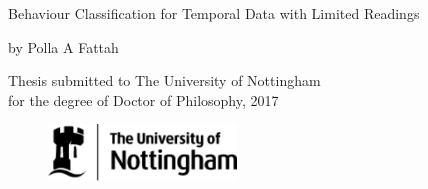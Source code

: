 \begin{titlepage}

\Huge 
\begin{center}

\vspace*{2cm}
Behaviour Classification for Temporal Data with Limited Readings

\vspace{1.5cm}

\LARGE

by Polla A Fattah

\vspace{1.5cm}


Thesis submitted to The University of Nottingham \\
for the degree of Doctor of Philosophy, 2017

\vspace{2.5cm}

\begin{figure}[h]
\centering
\includegraphics[width=5cm]{images/uni_logo}
\end{figure}

\end{center}

\end{titlepage}
